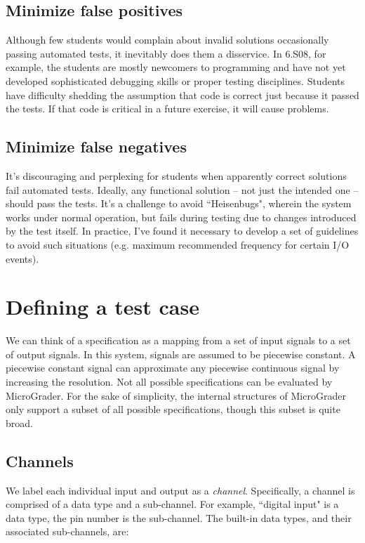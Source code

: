 \documentclass[12pt]{article}
\begin{document}
\subsection{Minimize false positives}
Although few students would complain about invalid solutions occasionally passing automated tests, it inevitably does them a disservice.  In 6.S08, for example, the students are mostly newcomers to programming and have not yet developed sophisticated debugging skills or proper testing disciplines.  Students have difficulty shedding the assumption that code is correct just because it passed the tests.  If that code is critical in a future exercise, it will cause problems.

\subsection{Minimize false negatives}
It's discouraging and perplexing for students when apparently correct solutions fail automated tests.  Ideally, any functional solution -- not just the intended one -- should pass the tests.  It's a challenge to avoid ``Heisenbugs", wherein the system works under normal operation, but fails during testing due to changes introduced by the test itself.  In practice, I've found it necessary to develop a set of guidelines to avoid such situations (e.g. maximum recommended frequency for certain I/O events).

\newpage
\section{Defining a test case}
We can think of a specification as a mapping from a set of input signals to a set of output signals.  In this system, signals are assumed to be piecewise constant.  A piecewise constant signal can approximate any piecewise continuous signal by increasing the resolution.  Not all possible specifications can be evaluated by MicroGrader.  For the sake of simplicity, the internal structures of MicroGrader only support a subset of all possible specifications, though this subset is quite broad.

\subsection{Channels}
We label each individual input and output as a \textit{channel}.  Specifically, a channel is comprised of a data type and a sub-channel.  For example, ``digital input" is a data type, the pin number is the sub-channel.  The built-in data types, and their associated sub-channels, are:
\end{document}
